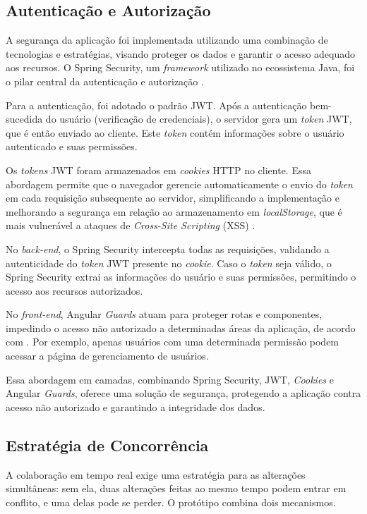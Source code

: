 \subsection[Autenticação e Autorização]{Autenticação e Autorização}
A segurança da aplicação foi implementada utilizando uma combinação de tecnologias e estratégias, visando proteger os dados e garantir o acesso adequado aos recursos.  O Spring Security, um \textit{framework} utilizado no ecossistema Java, foi o pilar central da autenticação e autorização \cite{SpringSecurity2024}.

Para a autenticação, foi adotado o padrão JWT.  Após a autenticação bem-sucedida do usuário (verificação de credenciais), o servidor gera um \textit{token} JWT, que é então enviado ao cliente. Este \textit{token} contém informações sobre o usuário autenticado e suas permissões.

Os \textit{tokens} JWT foram armazenados em \textit{cookies} HTTP no cliente. Essa abordagem permite que o navegador gerencie automaticamente o envio do \textit{token} em cada requisição subsequente ao servidor, simplificando a implementação e melhorando a segurança em relação ao armazenamento em \textit{localStorage}, que é mais vulnerável a ataques de \textit{Cross-Site Scripting} (XSS) \cite{Bulgakova2020}.

No \textit{back-end}, o Spring Security intercepta todas as requisições, validando a autenticidade do \textit{token} JWT presente no \textit{cookie}.  Caso o \textit{token} seja válido, o Spring Security extrai as informações do usuário e suas permissões, permitindo o acesso aos recursos autorizados.

No \textit{front-end}, Angular \textit{Guards} atuam para proteger rotas e componentes, impedindo o acesso não autorizado a determinadas áreas da aplicação, de acordo com .  Por exemplo, apenas usuários com uma determinada permissão podem acessar a página de gerenciamento de usuários.

Essa abordagem em camadas, combinando Spring Security, JWT, \textit{Cookies} e Angular \textit{Guards}, oferece uma solução de segurança, protegendo a aplicação contra acesso não autorizado e garantindo a integridade dos dados.

\subsection[Estratégia de Concorrência]{Estratégia de Concorrência}
A colaboração em tempo real exige uma estratégia para as alterações simultâneas: sem ela, duas alterações feitas ao mesmo tempo podem entrar em conflito, e uma delas pode se perder. O protótipo combina dois mecanismos.

